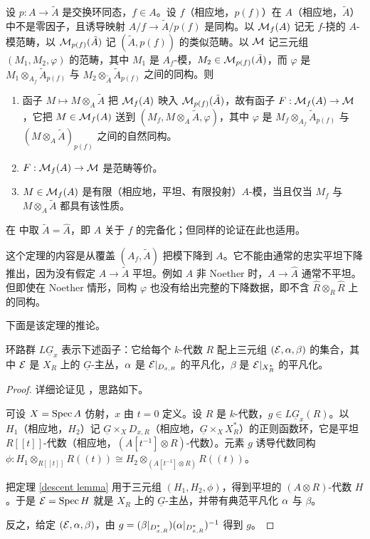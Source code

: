 \begin{thm}\label{descent lemma}
设 $p: A\to \tilde{A}$ 是交换环同态，$f\in A$。设 $f$（相应地，$p(f)$）在 $A$（相应地，$\tilde{A}$）中不是零因子，且诱导映射 $A/f\to \tilde{A}/p(f)$ 是同构。以 ${\mathcal M}_f(A)$ 记无 $f$-挠的 $A$-模范畴，以 ${\mathcal M}_{p(f)}(\tilde{A})$ 记 $(\tilde{A},p(f))$ 的类似范畴。以 ${\mathcal M}$ 记三元组 $(M_1,M_2,\varphi)$ 的范畴，其中 $M_1$ 是 $A_f$-模，$M_2\in {\mathcal M}_{p(f)}(\tilde{A})$，而 $\varphi$ 是 $M_1\otimes_{A_f}\tilde{A}_{p(f)}$ 与 $M_2\otimes_{\tilde{A}}\tilde{A}_{p(f)}$ 之间的同构。则
\begin{enumerate}
\item 函子 $M\mapsto M\otimes_A\tilde{A}$ 把 ${\mathcal M}_f(A)$ 映入 ${\mathcal M}_{p(f)}(\tilde{A})$，故有函子 $F : {\mathcal M}_f(A)\to {\mathcal M}$，它把 $M\in{\mathcal M}_f(A)$ 送到 $(M_f, M\otimes_A\tilde{A}, \varphi)$，其中 $\varphi$ 是 $M_f\otimes_{A_f}\tilde{A}_{p(f)}$ 与 $(M\otimes_A\tilde{A})_{p(f)}$ 之间的自然同构。
\item $F : {\mathcal M}_f(A)\to {\mathcal M}$ 是范畴等价。
\item $M\in{\mathcal M}_f(A)$ 是有限（相应地，平坦、有限投射）$A$-模，当且仅当 $M_f$ 与 $M\otimes_A\tilde{A}$ 都具有该性质。
\end{enumerate}
\end{thm}

在 \cite{BL2} 中取 $\tilde{A}=\hat A$，即 $A$ 关于 $f$ 的完备化；但同样的论证在此也适用。

\begin{rmk}
这个定理的内容是从覆盖 $(A_f, \tilde A)$ 把模下降到 $A$。它不能由通常的忠实平坦下降推出，因为没有假定 $A\to \tilde A$ 平坦。例如 $A$ 非 Noether 时，$A\to \hat A$ 通常不平坦。但即使在 Noether 情形，同构 $\varphi$ 也没有给出完整的下降数据，即不含 $\hat R\otimes_R\hat R$ 上的同构。
\end{rmk}

下面是该定理的推论。

\begin{cor}\label{global interpretation of loop}
环路群 $L\underline G_x$ 表示下述函子：它给每个 $k$-代数 $R$ 配上三元组 $({\mathcal E},{\alpha},\beta)$ 的集合，其中 ${\mathcal E}$ 是 $X_R$ 上的 $\underline G$-主丛，${\alpha}$ 是 ${\mathcal E}|_{D_{x,R}}$ 的平凡化，$\beta$ 是 ${\mathcal E}|_{X^*_R}$ 的平凡化。
\end{cor}

\begin{proof}
详细论证见 \cite[Lemma 6.1]{PZ}，思路如下。

可设 $X=\operatorname{Spec} A$ 仿射，$x$ 由 $t=0$ 定义。设 $R$ 是 $k$-代数，$g\in L\underline G_x(R)$。以 $H_1$（相应地，$H_2$）记 $\underline G\times_X D_{x,R}$（相应地，$\underline G\times_XX^*_R$）的正则函数环，它是平坦 $R[[t]]$-代数（相应地，$(A[t^{-1}]\otimes R)$-代数）。元素 $g$ 诱导代数同构 $\phi:H_1\otimes_{R[[t]]} R((t))\cong H_2 \otimes_{(A[t^{-1}]\otimes R)} R((t))$。

把定理 \ref{descent lemma} 用于三元组 $(H_1,H_2,\phi)$，得到平坦的 $(A\otimes R)$-代数 $H$。于是 ${\mathcal E}=\operatorname{Spec} H$ 就是 $X_R$ 上的 $\underline G$-主丛，并带有典范平凡化 ${\alpha}$ 与 $\beta$。

反之，给定 $({\mathcal E},{\alpha},\beta)$，由 $g=(\beta|_{D_{x,R}^*})({\alpha}|_{D_{x,R}^*})^{-1}$ 得到 $g$。
\end{proof}


